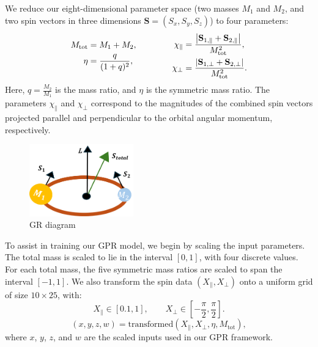 \documentclass[12pt]{article}
\begin{document}
We reduce our eight-dimensional parameter space (two masses \(M_1\) and \(M_2\), and two spin vectors in three dimensions \(\mathbf{S} = (S_x, S_y, S_z)\)) to four parameters:
\begin{align}
    \begin{aligned}
    M_{\mathrm{tot}} & = M_1 + M_2, \\
    \eta & = \frac{q}{(1 + q)^2},
    \end{aligned}
    \hspace{1.5cm}
    \begin{aligned}
    \chi_{\parallel} &= \frac{\left|\mathbf{S}_{1,\parallel} + \mathbf{S}_{2,\parallel}\right|}{M_{\mathrm{tot}}^2}, \\
    \chi_{\perp} &= \frac{\left|\mathbf{S}_{1,\perp} + \mathbf{S}_{2,\perp}\right|}{M_{\mathrm{tot}}^2}.
    \end{aligned}
\end{align}
Here, \( q = \frac{M_2}{M_1} \) is the mass ratio, and \( \eta \) is the symmetric mass ratio. The parameters \( \chi_{\parallel} \) and \( \chi_{\perp} \) correspond to the magnitudes of the combined spin vectors projected parallel and perpendicular to the orbital angular momentum, respectively.
\begin{figure}[H]
    \centering
    \includegraphics[width=0.4\textwidth]{LatexPlots/GRdiagram.png}
    \caption{GR diagram}
    \label{fig:gr_diagram}
\end{figure}
To assist in training our GPR model, we begin by scaling the input parameters. The total mass is scaled to lie in the interval \([0, 1]\), with four discrete values. For each total mass, the five symmetric mass ratios are scaled to span the interval \([-1, 1]\). 
We also transform the spin data \((X_{\parallel}, X_{\perp})\) onto a uniform grid of size \(10 \times 25\), with:
\[
X_{\parallel} \in [0.1, 1], \qquad X_{\perp} \in \left[-\frac{\pi}{2}, \frac{\pi}{2}\right].
\]
\begin{equation}
(x, y, z, w) = \text{transformed}(X_{\parallel}, X_{\perp}, \eta, M_{\text{tot}}),
\end{equation}
where \(x\), \(y\), \(z\), and \(w\) are the scaled inputs used in our GPR framework.
\end{document}

